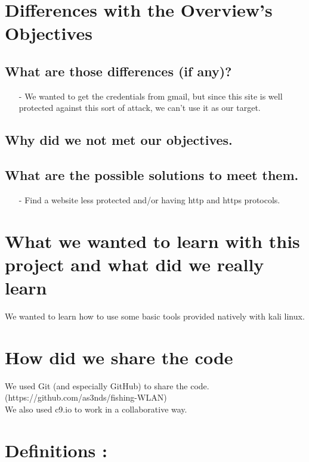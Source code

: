 \documentclass[a4paper, 11pt, oneside]{article}
\begin{document}
\section{Differences with the Overview's Objectives}

\subsection{What are those differences (if any)?}
\begin{itemize}
    \item[-] We wanted to get the credentials from gmail, but since this site is well protected against this sort of attack, we can't use it as our target.\\
\end{itemize}

\subsection{Why did we not met our objectives.}

\subsection{What are the possible solutions to meet them.}
\begin{itemize}
    \item[-] Find a website less protected and/or having http and https protocols.\\
\end{itemize}

\section{What we wanted to learn with this project and what did we really learn}
We wanted to learn how to use some basic tools provided natively with kali linux.\\

\section{How did we share the code}
We used Git (and especially GitHub) to share the code. (https://github.com/as3nds/fishing-WLAN)\\
We also used c9.io to work in a collaborative way.\\

\pagebreak

\section*{Definitions :}
\end{document}
